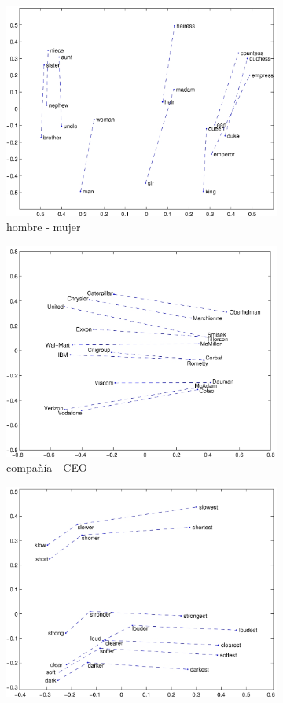 \begin{itemize}
\begin{itemize}
		\begin{figure}[!ht]
			\centering
			\small
			\begin{subfigure}{.55\textwidth}
				\centering
				\includegraphics[width=0.70\linewidth]{2/figures/glove_man-woman.jpg}
				\caption{hombre - mujer}
			\end{subfigure}%
			\begin{subfigure}{.55\textwidth}
				\centering
				\includegraphics[width=0.70\linewidth]{2/figures/glove_company-ceo.jpg}
				\caption{compañía - CEO}
			\end{subfigure}
			\begin{subfigure}{.55\textwidth}
				\centering
				\includegraphics[width=0.70\linewidth]{2/figures/glove_comparative-superlative.jpg}

\end{subfigure}
\end{figure}
\end{itemize}
\end{itemize}
